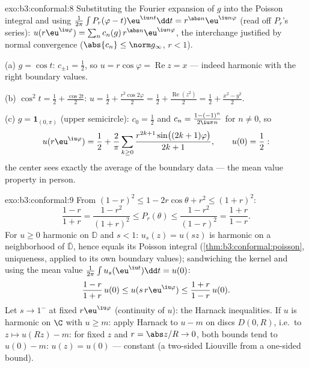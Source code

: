 \begin{solution}{exo:b3:conformal:8}
Substituting the Fourier expansion of $g$ into the Poisson
integral and using
$\frac1{2\pi}\int P_r(\varphi - t)\eu^{\iu nt}\dd t =
r^{\abs n}\eu^{\iu n\varphi}$ (read off $P_r$'s series):
$u(r\eu^{\iu\varphi}) = \sum_nc_n(g)\,r^{\abs
n}\eu^{\iu n\varphi}$, the interchange justified by normal
convergence ($\abs{c_n} \leq \norm g_\infty$, $r < 1$).

(a) $g = \cos t$: $c_{\pm1} = \frac12$, so $u =
r\cos\varphi = \operatorname{Re}z = x$ --- indeed harmonic
with the right boundary values.

(b) $\cos^2t = \frac12 + \frac{\cos 2t}2$: $u = \frac12 +
\frac{r^2\cos2\varphi}2 = \frac12 +
\frac{\operatorname{Re}(z^2)}2 = \frac12 + \frac{x^2 -
y^2}{2}$.

(c) $g = \mathbf 1_{(0,\pi)}$ (upper semicircle): $c_0 =
\frac12$ and $c_n = \frac{1 - (-1)^n}{2\iu\pi n}$ for $n \neq
0$, so
\[
u(r\eu^{\iu\varphi}) = \frac12 + \frac2\pi\sum_{k\geq0}
\frac{r^{2k+1}\sin\bigl((2k+1)\varphi\bigr)}{2k + 1},
\qquad u(0) = \frac12 :
\]
the center sees exactly the average of the boundary data ---
the mean value property in person.
\end{solution}

\begin{solution}{exo:b3:conformal:9}
From $(1-r)^2 \leq 1 - 2r\cos\theta + r^2 \leq (1+r)^2$:
\[
\frac{1-r}{1+r} = \frac{1 - r^2}{(1+r)^2} \leq P_r(\theta)
\leq \frac{1 - r^2}{(1 - r)^2} = \frac{1+r}{1-r} .
\]
For $u \geq 0$ harmonic on $\mathbb D$ and $s < 1$: $u_s(z) =
u(sz)$ is harmonic on a neighborhood of $\bar{\mathbb D}$,
hence equals its Poisson integral
(\cref{thm:b3:conformal:poisson}, uniqueness, applied to its
own boundary values); sandwiching the kernel and using the
mean value $\frac1{2\pi}\int u_s(\eu^{\iu t})\dd t = u(0)$:
\[
\frac{1-r}{1+r}\,u(0) \leq u(s\,r\eu^{\iu\varphi}) \leq
\frac{1+r}{1-r}\,u(0).
\]
Let $s \to 1^-$ at fixed $r\eu^{\iu\varphi}$ (continuity of
$u$): the Harnack inequalities. If $u$ is harmonic on $\C$
with $u \geq m$: apply Harnack to $u - m$ on discs $D(0, R)$,
i.e.\ to $z \mapsto u(Rz) - m$: for fixed $z$ and $r =
\abs z/R \to 0$, both bounds tend to $u(0) - m$: $u(z) =
u(0)$ --- constant (a two-sided Liouville from a one-sided
bound).
\end{solution}

